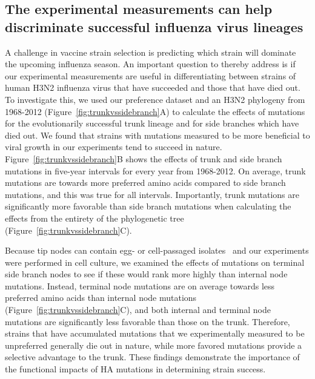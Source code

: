 \documentclass[11pt]{article}
\begin{document}
\subsection*{The experimental measurements can help discriminate successful influenza virus lineages}
A challenge in vaccine strain selection is predicting which strain will dominate the upcoming influenza season.
An important question to thereby address is if our experimental measurements are useful in differentiating between strains of human H3N2 influenza virus that have succeeded and those that have died out.
To investigate this, we used our preference dataset and an H3N2 phylogeny from 1968-2012 (Figure~\ref{fig:trunkvssidebranch}A) to calculate the effects of mutations for the evolutionarily successful trunk lineage and for side branches which have died out.
We found that strains with mutations measured to be more beneficial to viral growth in our experiments tend to succeed in nature.
Figure~\ref{fig:trunkvssidebranch}B shows the effects of trunk and side branch mutations in five-year intervals for every year from 1968-2012. 
On average, trunk mutations are towards more preferred amino acids compared to side branch mutations, and this was true for all intervals.
Importantly, trunk mutations are significantly more favorable than side branch mutations when calculating the effects from the entirety of the phylogenetic tree (Figure~\ref{fig:trunkvssidebranch}C).

Because tip nodes can contain egg- or cell-passaged isolates~\citep{wu2017structural,mcwhite2016sequence,skowronski2016mutations} and our experiments were performed in cell culture, we examined the effects of mutations on terminal side branch nodes to see if these would rank more highly than internal node mutations.
Instead, terminal node mutations are on average towards less preferred amino acids than internal node mutations (Figure~\ref{fig:trunkvssidebranch}C), and both internal and terminal node mutations are significantly less favorable than those on the trunk.
Therefore, strains that have accumulated mutations that we experimentally measured to be unpreferred generally die out in nature, while more favored mutations provide a selective advantage to the trunk.
These findings demonstrate the importance of the functional impacts of HA mutations in determining strain success.
\end{document}
